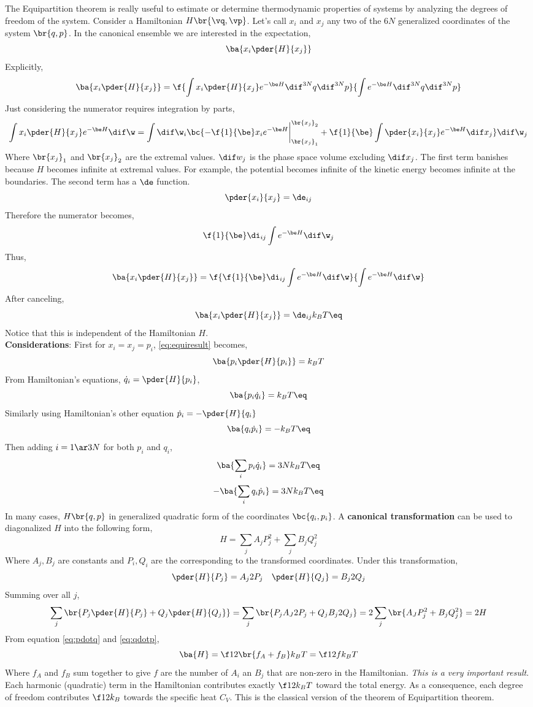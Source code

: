 \documentclass{article}
\begin{document}
{The Equipartition theorem is really useful to estimate or determine thermodynamic properties of systems by analyzing the degrees of freedom of the system. Consider a Hamiltonian $H \br{\vq, \vp}$. Let's call $x_i$ and $x_j$ any two of the $6N$ generalized coordinates of the system $\br{q,p}$. In the canonical ensemble we are interested in the expectation,
\[ \ba{x_i \pder{H}{x_j}} \]
Explicitly,
\[ \ba{x_i \pder{H}{x_j}} = \f{\int x_i \pder{H}{x_j} e^{-\be H} \dif^{3N} q \dif^{3N} p}{\int e^{-\be H} \dif^{3N} q \dif^{3N} p} \]
Just considering the numerator requires integration by parts,
\[ \int x_i \pder{H}{x_j} e^{-\be H} \dif \w = \int \dif \w_i\bc{ - \f{1}{\be} x_i e^{-\be H}\bigg\rvert_{\br{x_j}_1}^{\br{x_j}_2} + \f{1}{\be}\int  \pder{x_i}{x_j} e^{-\be H} \dif x_j} \dif \w_j  \]
Where $\br{x_j}_1$ and $\br{x_j}_2$ are the extremal values. $\dif w_j$ is the phase space volume excluding $\dif x_j$. The first term banishes because $H$ becomes infinite at extremal values. For example, the potential becomes infinite of the kinetic energy becomes infinite at the boundaries. The second term has a $\de$ function.
\[ \pder{x_i}{x_j} = \de_{ij} \]
Therefore the numerator becomes,
\[ \f{1}{\be} \di_{ij} \int e^{-\be H} \dif \w_j \]
Thus,
\[ \ba{x_i \pder{H}{x_j}} = \f{\f{1}{\be} \di_{ij} \int e^{-\be H} \dif \w}{\int e^{-\be H} \dif \w} \]
After canceling,
\[\ba{x_i \pder{H}{x_j}} = \de_{ij} k_B T \eq \label{eq:equiresult}\]
Notice that this is independent of the Hamiltonian $H$.\\

\textbf{Considerations}:
First for $x_i = x_j = p_i$, \eqref{eq:equiresult} becomes,
\[\ba{p_i \pder{H}{p_i}} = k_B T \]
From Hamiltonian's equations, $\dot{q}_i = \pder{H}{p_i}$,
\[\ba{p_i \dot{q}_i} = k_B T \eq \label{eq:pdotq} \]
Similarly using Hamiltonian's other equation $\dot{p}_i = -\pder{H}{q_i}$
\[\ba{q_i \dot{p}_i} = -k_B T \eq \label{eq:qdotp}\]
Then adding $i=1\ar3N$ for both $p_i$ and $q_i$,
\[ \ba{\sum_i p_i \dot{q}_i} = 3 N k_B T \eq \label{eq:sumpdotq}\]
\[ -\ba{\sum_i q_i \dot{p}_i} = 3 N k_B T \eq \label{eq:sumqdotp}\]
In many cases, $H\br{q,p}$ in generalized quadratic form of the coordinates $\bc{q_i, p_i}$. A \textbf{canonical transformation} can be used to diagonalized $H$ into the following form,
\[ H = \sum_j A_j P_j^2 + \sum_j B_j Q_j^2 \]
Where $A_j, B_j$ are constants and $P_i,Q_i$ are the corresponding to the transformed coordinates. Under this transformation,
\[ \pder{H}{P_j} = A_j 2 P_j \quad \pder{H}{Q_j} = B_j 2 Q_j \]
Summing over all $j$,
\[ \sum_j \br{P_j \pder{H}{P_j} + Q_j \pder{H}{Q_j}} = \sum_j \br{P_j A_J 2 P_j + Q_j B_j 2 Q_j} = 2\sum_j \br{A_J P_j^2 + B_j Q_j^2} = 2H \]
From equation \eqref{eq:pdotq} and \eqref{eq:qdotp},
\[ \ba{H} = \f12 \br{f_A + f_B} k_B T = \f12 f k_B T \]
Where $f_A$ and $f_B$ sum together to give $f$ are the number of $A_i$ an $B_j$ that are non-zero in the Hamiltonian. \textit{This is a very important result}. Each harmonic (quadratic) term in the Hamiltonian contributes exactly $\f12 k_B T$ toward the total energy. As a consequence, each degree of freedom contributes $\f12 k_B$ towards the specific heat $C_V$. This is the classical version of the theorem of Equipartition theorem. \\

}
\end{document}
